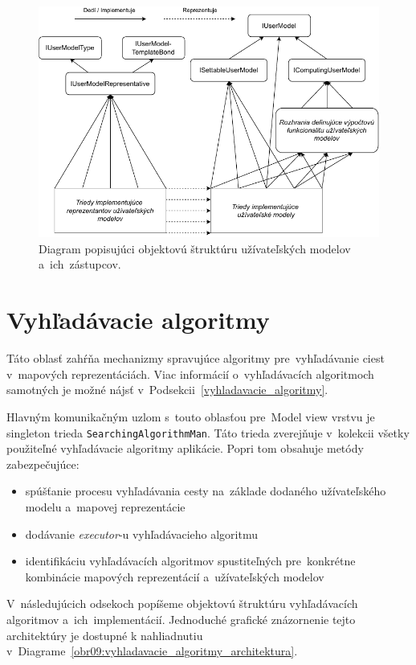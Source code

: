 \begin{figure}[h]\centering
\includegraphics[]{img/uzivatelske_modely_architektura}
\caption{Diagram popisujúci objektovú štruktúru užívateľských modelov a~ich~zástupcov.} 
\label{obr08:uzivatelske_modely_architektura}
\end{figure}

\section{Vyhľadávacie algoritmy}

Táto oblasť zahŕňa mechanizmy spravujúce algoritmy pre~vyhľadávanie ciest v~mapových reprezentáciách. Viac informácií o~vyhľadávacích algoritmoch samotných je možné nájsť v~Podsekcii~\ref{vyhladavacie_algoritmy}. 

Hlavným komunikačným uzlom s~touto oblasťou pre~Model view vrstvu je singleton trieda \texttt{SearchingAlgorithmMan}. Táto trieda zverejňuje v~kolekcii všetky použiteľné vyhľadávacie algoritmy aplikácie. Popri tom obsahuje metódy zabezpečujúce: 
\begin{itemize}
    \item spúšťanie procesu vyhľadávania cesty na~základe dodaného užívateľského modelu a~mapovej reprezentácie
    \item dodávanie \textit{executor}-u vyhľadávacieho algoritmu
    \item identifikáciu vyhľadávacích algoritmov spustiteľných pre~konkrétne kombinácie mapových reprezentácií a~užívateľských modelov 
\end{itemize}

V~následujúcich odsekoch popíšeme objektovú štruktúru vyhľadávacích algoritmov a~ich~implementácií. Jednoduché grafické znázornenie tejto architektúry je dostupné k nahliadnutiu v~Diagrame~\ref{obr09:vyhladavacie_algoritmy_architektura}.   


